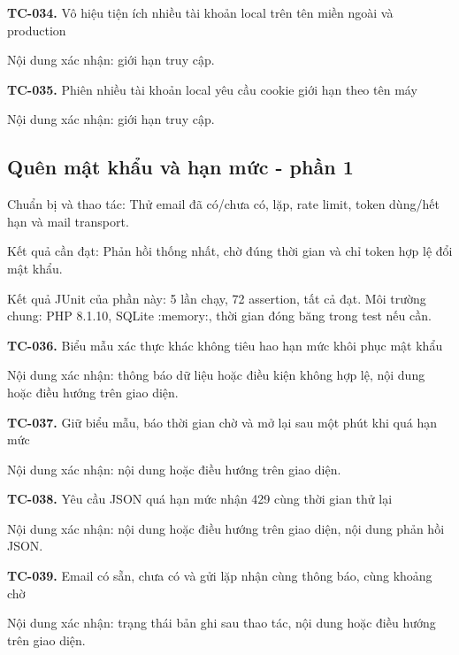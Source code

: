 \noindent\textbf{TC-034.} Vô hiệu tiện ích nhiều tài khoản local trên tên miền ngoài và production\par
Nội dung xác nhận:\allowbreak{} giới hạn truy cập.\allowbreak{}

\noindent\textbf{TC-035.} Phiên nhiều tài khoản local yêu cầu cookie giới hạn theo tên máy\par
Nội dung xác nhận:\allowbreak{} giới hạn truy cập.\allowbreak{}


\par\vspace{8pt}

\subsection{Quên mật khẩu và hạn mức - phần 1}
Chuẩn bị và thao tác:\allowbreak{} Thử email đã có/\allowbreak{}chưa có, lặp, rate limit, token dùng/\allowbreak{}hết hạn và mail transport.\allowbreak{}

Kết quả cần đạt:\allowbreak{} Phản hồi thống nhất, chờ đúng thời gian và chỉ token hợp lệ đổi mật khẩu.\allowbreak{}

Kết quả JUnit của phần này:\allowbreak{} 5 lần chạy, 72 assertion, tất cả đạt.\allowbreak{} Môi trường chung:\allowbreak{} PHP 8.\allowbreak{}1.\allowbreak{}10, SQLite :\allowbreak{}memory:\allowbreak{}, thời gian đóng băng trong test nếu cần.\allowbreak{}

\noindent\textbf{TC-036.} Biểu mẫu xác thực khác không tiêu hao hạn mức khôi phục mật khẩu\par
Nội dung xác nhận:\allowbreak{} thông báo dữ liệu hoặc điều kiện không hợp lệ, nội dung hoặc điều hướng trên giao diện.\allowbreak{}

\noindent\textbf{TC-037.} Giữ biểu mẫu, báo thời gian chờ và mở lại sau một phút khi quá hạn mức\par
Nội dung xác nhận:\allowbreak{} nội dung hoặc điều hướng trên giao diện.\allowbreak{}

\noindent\textbf{TC-038.} Yêu cầu JSON quá hạn mức nhận 429 cùng thời gian thử lại\par
Nội dung xác nhận:\allowbreak{} nội dung hoặc điều hướng trên giao diện, nội dung phản hồi JSON.\allowbreak{}

\noindent\textbf{TC-039.} Email có sẵn, chưa có và gửi lặp nhận cùng thông báo, cùng khoảng chờ\par
Nội dung xác nhận:\allowbreak{} trạng thái bản ghi sau thao tác, nội dung hoặc điều hướng trên giao diện.\allowbreak{}

